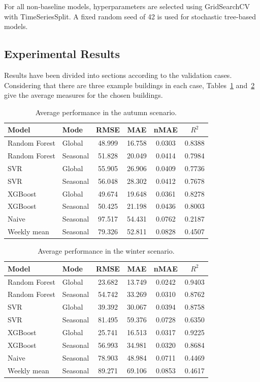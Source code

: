 \documentclass[conference]{IEEEtran}
\begin{document}
For all non-baseline models, hyperparameters are selected using
GridSearchCV with TimeSeriesSplit. A fixed random seed of 42 is used for stochastic
tree-based models.

\subsection{Experimental Results}

Results have been divided into sections according to the validation cases. Considering that there are three example buildings in each case, Tables~\ref{tab:autumn-results-paper} and~\ref{tab:winter-results-paper} give the average measures for the chosen buildings.

\begin{table}[H]
\centering
\scriptsize
\caption{Average performance in the autumn scenario.}
\label{tab:autumn-results-paper}
\begin{tabular}{llcccc}
\hline
\textbf{Model} & \textbf{Mode} & \textbf{RMSE} & \textbf{MAE} & \textbf{nMAE} & \textbf{$R^2$} \\
\hline
Random Forest & Global & 48.999 & 16.758 & 0.0303 & 0.8388 \\
Random Forest & Seasonal & 51.828 & 20.049 & 0.0414 & 0.7984 \\
SVR & Global & 55.905 & 26.906 & 0.0409 & 0.7736 \\
SVR & Seasonal & 56.048 & 28.302 & 0.0412 & 0.7678 \\
XGBoost & Global & 49.674 & 19.648 & 0.0361 & 0.8278 \\
XGBoost & Seasonal & 50.425 & 21.198 & 0.0436 & 0.8003 \\
Naive & Seasonal & 97.517 & 54.431 & 0.0762 & 0.2187 \\
Weekly mean & Seasonal & 79.326 & 52.811 & 0.0828 & 0.4507 \\
\hline
\end{tabular}
\end{table}

\begin{table}[H]
\centering
\scriptsize
\caption{Average performance in the winter scenario.}
\label{tab:winter-results-paper}
\begin{tabular}{llcccc}
\hline
\textbf{Model} & \textbf{Mode} & \textbf{RMSE} & \textbf{MAE} & \textbf{nMAE} & \textbf{$R^2$} \\
\hline
Random Forest & Global & 23.682 & 13.749 & 0.0242 & 0.9403 \\
Random Forest & Seasonal & 54.742 & 33.269 & 0.0310 & 0.8762 \\
SVR & Global & 39.392 & 30.067 & 0.0394 & 0.8758 \\
SVR & Seasonal & 81.495 & 59.376 & 0.0728 & 0.6350 \\
XGBoost & Global & 25.741 & 16.513 & 0.0317 & 0.9225 \\
XGBoost & Seasonal & 56.993 & 34.981 & 0.0320 & 0.8684 \\
Naive & Seasonal & 78.903 & 48.984 & 0.0711 & 0.4469 \\
Weekly mean & Seasonal & 89.271 & 69.106 & 0.0853 & 0.4617 \\
\hline
\end{tabular}
\end{table}
\end{document}
